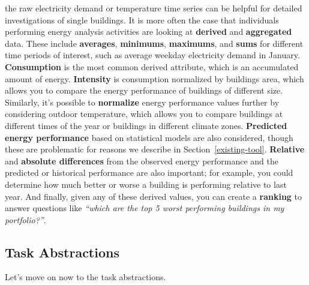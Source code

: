 \documentclass[journal]{vgtc}                %
\newcommand{\bstart}[1]{\vspace{1mm} \noindent{\textbf{#1:}}}
\begin{document}
\bstart{Derived data} the raw electricity demand or temperature time series can be helpful for detailed investigations of single buildings. 
It is more often the case that individuals performing energy analysis activities are looking at {\bf derived} and {\bf aggregated} data. 
These include {\bf averages}, {\bf minimums}, {\bf maximums}, and {\bf sums} for different time periods of interest, such as average weekday electricity demand in January.
{\bf Consumption} is the most common derived attribute, which is an accumulated amount of energy.
{\bf Intensity} is consumption normalized by buildings area, which allows you to compare the energy performance of buildings of different size.
Similarly, it's possible to {\bf normalize} energy performance values further by considering outdoor temperature, which allows you to compare buildings at different times of the year or buildings in different climate zones.
{\bf Predicted energy performance} based on statistical models are also considered, though these are problematic for reasons we describe in Section~\ref{existing-tool}.
{\bf Relative} and {\bf absolute differences} from the observed energy performance and the predicted or historical performance are also important; for example, you could determine how much better or worse a building is performing relative to last year.
And finally, given any of these derived values, you can create a {\bf ranking} to answer questions like {\it ``which are the top 5 worst performing buildings in my portfolio?''}.


\subsection{Task Abstractions}
\label{task-abstractions}


Let's move on now to the task abstractions.
\end{document}
